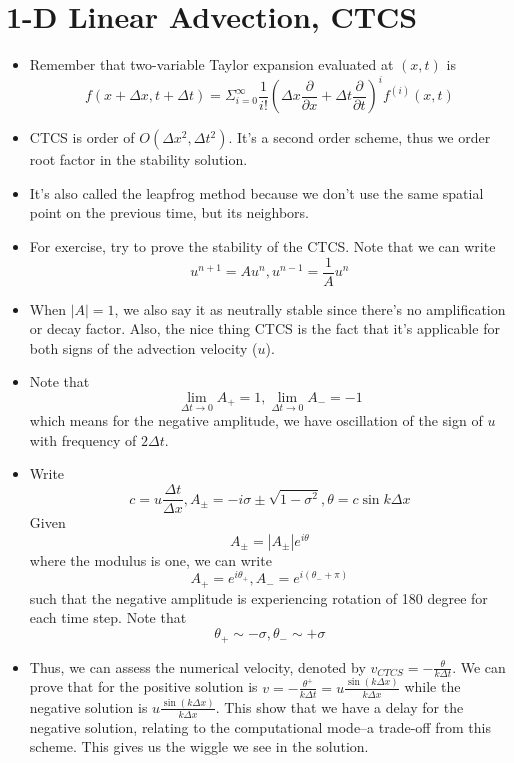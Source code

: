 \documentclass{article}
\begin{document}
\section{1-D Linear Advection, CTCS}
\begin{itemize}
    \item Remember that two-variable Taylor expansion evaluated at $(x,t)$ is
    \[ f(x+\Delta x, t+\Delta t) = \Sigma_{i=0}^{\infty} \frac{1}{i!}\left(\Delta x \frac{\partial}{\partial x} + \Delta t \frac{\partial}{\partial t}\right)^i f^{(i)}(x,t) \]
    \item CTCS is order of $O(\Delta x^2, \Delta t^2)$. It's a second order scheme, thus we order root factor in the stability solution.
    \item It's also called the leapfrog method because we don't use the same spatial point on the previous time, but its neighbors.
    \item For exercise, try to prove the stability of the CTCS. Note that we can write
    \[
        u^{n+1} = A u^n, u^{n-1} = \frac{1}{A} u^n
    \]
    \item When $|A|=1$, we also say it as neutrally stable since there's no amplification or decay factor. Also, the nice thing CTCS is the fact that it's applicable for both signs of the advection velocity ($u$).
    \item Note that
    \[ \lim_{\Delta t \rightarrow 0} A_+ = 1,  \lim_{\Delta t \rightarrow 0} A_- = -1 \]
    which means for the negative amplitude, we have oscillation of the sign of $u$ with frequency of $2\Delta t$.
    \item Write
    \[ c=u\frac{\Delta t}{\Delta x}, A_{\pm} = -i\sigma \pm \sqrt{1-\sigma^2}, \theta = c\sin{k\Delta x} \]
    Given
    \[A_{\pm} = |A_\pm| e^{i\theta}\]
    where the modulus is one, we can write
    \[A_+ = e^{i\theta_+}, A_- = e^{i(\theta_- + \pi)}\]
    such that the negative amplitude is experiencing rotation of 180 degree for each time step. Note that
    \[ \theta_+ \sim -\sigma, \theta_- \sim +\sigma \]
    
    \item Thus, we can assess the numerical velocity, denoted by $v_{CTCS}=-\frac{\theta}{k\Delta t}$. We can prove that for the positive solution is $v = -\frac{\theta^+}{k\Delta t} = u\frac{\sin{(k\Delta x)}}{k \Delta x}$ while the negative solution is $u\frac{\sin{(k\Delta x)}}{k \Delta x}$. This show that we have a delay for the negative solution, relating to the computational mode--a trade-off from this scheme. This gives us the wiggle we see in the solution.
    

\end{itemize}
\end{document}
